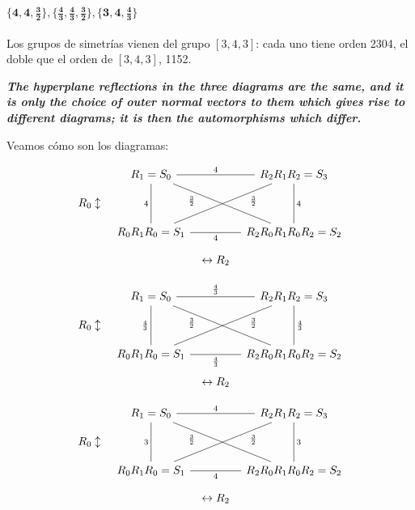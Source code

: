 \documentclass[spanish]{article}
\theoremstyle{definition}
\begin{document}
\paragraph{$\mathbf{\{4,4,\frac{3}{2}\},\{\frac{4}{3},\frac{4}{3},\frac{3}{2}\},\{3,4,\frac{4}{3}\}}$}
Los grupos de simetrías vienen del grupo $[3,4,3]$: cada uno tiene orden 2304, el doble que el orden de $[3,4,3]$, 1152.

{\color{magenta}\textbf{\textit{The hyperplane reflections in the three diagrams are the same, and it is only the choice of outer normal vectors to them which gives rise to different diagrams; it is then the automorphisms which differ.}}}

Veamos cómo son los diagramas:

\[\begin{tikzcd}[column sep=tiny,row sep=small]
	&R_1=S_0\arrow[dd,no head,swap,"4"]\arrow[rr,no head,"4"]\arrow[ddrr,"\frac{3}{2}",no head,near start,swap]&&R_2R_1R_2=S_3\arrow[dd,no head,"4"]\\
	R_0\updownarrow\\
	&R_0R_1R_0=S_1\arrow[rr,no head,swap,"4"]\arrow[rruu,no head,"\frac{3}{2}",near end,swap]&&R_2R_0R_1R_0R_2=S_2\\
	&&\leftrightarrow R_2
\end{tikzcd}\]

\[\begin{tikzcd}[column sep=tiny,row sep=small]
	&R_1=S_0\arrow[dd,no head,swap,"\frac{4}{3}"]\arrow[rr,no head,"\frac{4}{3}"]\arrow[ddrr,"\frac{3}{2}",no head,near start,swap]&&R_2R_1R_2=S_3\arrow[dd,no head,"\frac{4}{3}"]\\
	R_0\updownarrow\\
	&R_0R_1R_0=S_1\arrow[rr,no head,swap,"\frac{4}{3}"]\arrow[rruu,no head,"\frac{3}{2}",near end,swap]&&R_2R_0R_1R_0R_2=S_2\\
	&&\leftrightarrow R_2
\end{tikzcd}\]

\[\begin{tikzcd}[column sep=tiny,row sep=small]
	&R_1=S_0\arrow[dd,no head,swap,"3"]\arrow[rr,no head,"4"]\arrow[ddrr,"\frac{3}{2}",no head,near start,swap]&&R_2R_1R_2=S_3\arrow[dd,no head,"3"]\\
	R_0\updownarrow\\
	&R_0R_1R_0=S_1\arrow[rr,no head,swap,"4"]\arrow[rruu,no head,"\frac{3}{2}",near end,swap]&&R_2R_0R_1R_0R_2=S_2\\
	&&\leftrightarrow R_2
\end{tikzcd}\]
\end{document}
